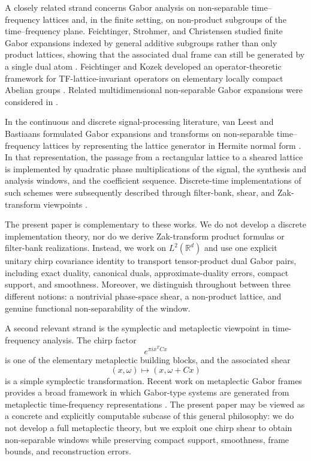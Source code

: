 \documentclass[final,1p,times,authoryear]{elsarticle}
\theoremstyle{definition}
\newcommand{\1}{\mathbf{1}}
\begin{document}
A closely related strand concerns Gabor analysis on non-separable time--frequency lattices
and, in the finite setting, on non-product subgroups of the time--frequency plane.
Feichtinger, Strohmer, and Christensen studied finite Gabor expansions indexed by
general additive subgroups rather than only product lattices, showing that the associated
dual frame can still be generated by a single dual atom \citep{FeichtingerStrohmerChristensen1995}.
Feichtinger and Kozek developed an operator-theoretic framework for TF-lattice-invariant
operators on elementary locally compact Abelian groups \citep{FeichtingerKozek1998}.
Related multidimensional non-separable Gabor expansions were considered in
\citep{FeichtingerKozekPrinzStrohmer1996}.

In the continuous and discrete signal-processing literature, van Leest and Bastiaans
formulated Gabor expansions and transforms on non-separable time--frequency lattices
by representing the lattice generator in Hermite normal form
\citep{VanLeestBastiaans2000}. In that representation, the passage from a rectangular
lattice to a sheared lattice is implemented by quadratic phase multiplications of the
signal, the synthesis and analysis windows, and the coefficient sequence. Discrete-time
implementations of such schemes were subsequently described through filter-bank,
shear, and Zak-transform viewpoints \citep{VanLeest1999,VanLeestBastiaans2004}.

The present paper is complementary to these works. We do not develop a discrete
implementation theory, nor do we derive Zak-transform product formulas or filter-bank
realizations. Instead, we work on $L^2(\mathbb R^d)$ and use one explicit unitary chirp
covariance identity to transport tensor-product dual Gabor pairs, including exact duality,
canonical duals, approximate-duality errors, compact support, and smoothness. Moreover,
we distinguish throughout between three different notions: a nontrivial phase-space shear,
a non-product lattice, and genuine functional non-separability of the window.

A second relevant strand is the symplectic and metaplectic viewpoint in time-frequency analysis.
The chirp factor
$$
e^{\pi i x^T Cx}
$$
is one of the elementary metaplectic building blocks, and the associated shear
$$
(x,\omega)\mapsto (x,\omega+Cx)
$$
is a simple symplectic transformation. Recent work on metaplectic Gabor frames provides a broad framework in
which Gabor-type systems are generated from metaplectic time-frequency representations \citep{CorderoGiacchi24}.
The present paper may be viewed as a concrete and explicitly computable subcase of this general philosophy:
we do not develop a full metaplectic theory, but we exploit one chirp shear to obtain non-separable windows
while preserving compact support, smoothness, frame bounds, and reconstruction errors.
\end{document}
